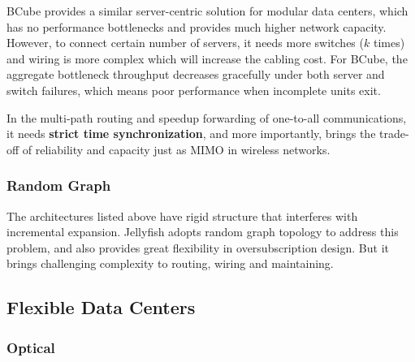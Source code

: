 \documentclass[journal,onecolumn,11pt]{IEEEtran}
\begin{document}
BCube provides a similar server-centric solution for modular data centers, which has no performance bottlenecks and provides much higher network capacity. However, to connect certain number of servers, it needs more switches ($k$ times) and wiring is more complex which will increase the cabling cost. For BCube, the aggregate bottleneck throughput decreases gracefully under both server and switch failures, which means poor performance when incomplete units exit.

In the multi-path routing and speedup forwarding of one-to-all communications, it needs \textbf{strict time synchronization}, and more importantly, brings the trade-off of reliability and capacity just as MIMO in wireless networks.

%
%

\subsubsection{Random Graph}

The architectures listed above have rigid structure that interferes with incremental expansion. Jellyfish adopts random graph topology to address this problem, and also provides great flexibility in oversubscription design. But it brings challenging complexity to routing, wiring and maintaining.

\subsection{Flexible Data Centers}

\subsubsection{Optical}
\end{document}

